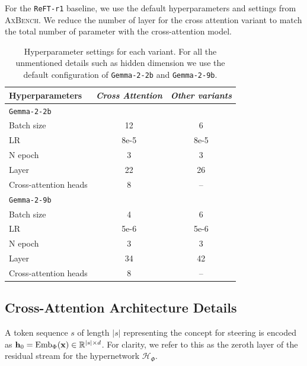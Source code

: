 \documentclass[11pt]{article}
\begin{document}
For the \texttt{ReFT-r1} baseline, we use the default hyperparameters and settings from \textsc{AxBench}. We reduce the number of layer for the cross attention variant to match the total number of parameter with the cross-attention model.

\begin{table}[ht!]
  \small
  \centering
  \begin{tabularx}{\columnwidth}{l c c}
    \toprule
    \textbf{Hyperparameters} 
      & \textbf{\textit{Cross Attention}} &  \textbf{\textit{Other variants}} \\
    \midrule
    \texttt{Gemma-2-2b} & \\
    Batch size  
      & 12 & 6 \\
    LR  
      & 8e-5 & 8e-5  \\
    N epoch  
      & 3 & 3 \\
    Layer
      & 22 & 26 \\
    Cross-attention heads 
    & 8 & -- \\     
    \midrule
    \texttt{Gemma-2-9b} & \\
    Batch size  
      & 4 & 6 \\
    LR  
      & 5e-6 & 5e-6  \\
    N epoch  
      & 3 & 3 \\
    Layer
      & 34 & 42 \\
    Cross-attention heads 
    & 8 & -- \\     
    \bottomrule
  \end{tabularx}
  \caption{Hyperparameter settings for each variant. For all the unmentioned details such as hidden dimension we use the default configuration of \texttt{Gemma-2-2b} and \texttt{Gemma-2-9b}.}
  \label{table:hparams}
\end{table}

\label{appendix:hparams}

\subsection{Cross-Attention Architecture Details}

\label{appendix:crossattn-model}

A token sequence $s$ of length $|s|$ representing the concept for steering is encoded as ${\bf h}_0 = \mathrm{Emb}_\Phi({\bf x}) \in \mathbb{R}^{|s|\times d}$. For clarity, we refer to this as the zeroth layer of the residual stream for the hypernetwork $\mathcal H_\Phi$.
\end{document}
